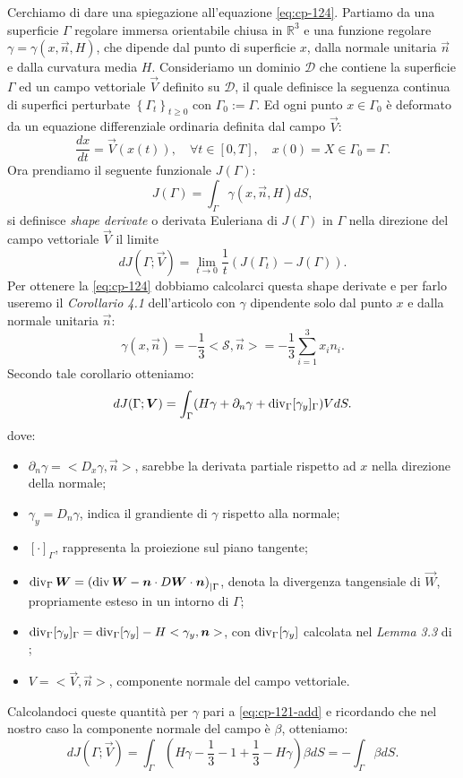 \begin{osservazione}
\label{oss:cp-122}
Cerchiamo di dare una spiegazione all'equazione \eqref{eq:cp-124}. Partiamo da una superficie $\Gamma$ regolare immersa orientabile chiusa in $\mathbb{R}^3$
e una funzione regolare $\gamma=\gamma(x,\vec{n},H)$, che dipende dal punto di superficie $x$, dalla normale unitaria $\vec{n}$ e dalla curvatura media $H$.
Consideriamo un dominio $\mathcal{D}$ che contiene la superficie $\Gamma$ ed un campo vettoriale $\vec{V}$ definito su $\mathcal{D}$, il quale definisce la seguenza continua di superfici perturbate $\left\{\Gamma_t\right\}_{t\ge 0}$ con $\Gamma_0:=\Gamma$. Ed ogni punto $x\in \Gamma_0$ è deformato da un equazione differenziale ordinaria definita dal campo $\vec{V}$:
\[
\frac{dx}{dt}=\vec{V}(x(t)),\quad \forall t\in[0,T],\quad x(0)=X\in\Gamma_0=\Gamma.
\]
Ora prendiamo il seguente funzionale $J(\Gamma)$:
\[
J(\Gamma) = \int_{\Gamma}\gamma(x,\vec{n},H)dS,
\]
si definisce \emph{shape derivate} o derivata Euleriana di $J(\Gamma)$ in $\Gamma$ nella direzione del campo vettoriale $\vec{V}$ il limite
\[
dJ(\Gamma;\vec{V}) = \lim_{t\to 0}\frac{1}{t}(J(\Gamma_t)-J(\Gamma)).
\]
Per ottenere la \eqref{eq:cp-124} dobbiamo calcolarci questa shape derivate e per farlo useremo il \emph{Corollario 4.1} dell'articolo \cite[vedi][]{dog:noch} con $\gamma$ dipendente solo dal punto $x$ e dalla normale unitaria $\vec{n}$: 
\begin{equation}
\label{eq:cp-121-add}
\gamma(x,\vec{n})=-\frac{1}{3}<\mathcal{S},\vec{n}> = -\frac{1}{3}\sum_{i=1}^3x_in_i.
\end{equation}
Secondo tale corollario otteniamo:
\[
dJ(\Gamma;\bm{V}) = \int_{\Gamma}(H\gamma+\partial_{n}\gamma+\operatorname{div}_{\Gamma}[\gamma_y]_{\Gamma})VdS.
\]
dove:
\begin{itemize}
  \item $\partial_n\gamma=<D_x\gamma,\vec{n}>$, sarebbe la derivata partiale rispetto ad $x$ nella direzione della normale;
  \item $\gamma_y=D_n\gamma$, indica il grandiente di $\gamma$ rispetto alla normale;
  \item $[\cdot]_{\Gamma}$, rappresenta la proiezione sul piano tangente;
  \item $\operatorname{div}_{\Gamma}\bm{W}=\left(\operatorname{div}\bm{W}-\bm{n}\cdot D\bm{W} \cdot \bm{n}\right)_{|\Gamma}$, denota la divergenza tangensiale di $\vec{W}$, propriamente esteso in un intorno di $\Gamma$;
  \item $\operatorname{div}_{\Gamma}[\gamma_y]_{\Gamma}=\operatorname{div}_{\Gamma}[\gamma_y]-H<\gamma_y,\bm{n}>$, con $\operatorname{div}_{\Gamma}[\gamma_y]$ calcolata nel \emph{Lemma 3.3} di \cite[vedi][]{dog:noch};
  \item $V=<\vec{V},\vec{n}>$, componente normale del campo vettoriale.
\end{itemize}
Calcolandoci queste quantità per $\gamma$ pari a \eqref{eq:cp-121-add} e ricordando che nel nostro caso la componente normale del campo è $\beta$,  otteniamo:
\[
dJ(\Gamma;\vec{V})=\int_{\Gamma}(H\gamma -\frac{1}{3} -1 +\frac{1}{3} -H\gamma)\beta dS=-\int_{\Gamma}\beta dS.
\]
\end{osservazione}
%
%
%
%
